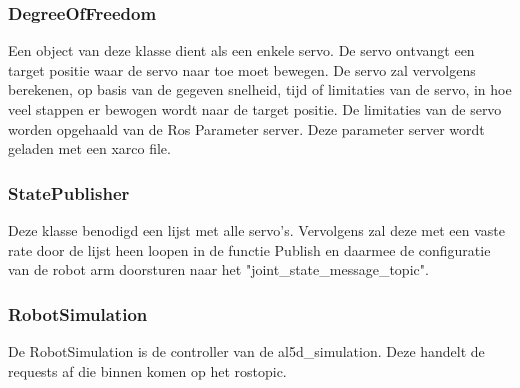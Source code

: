 \documentclass[11pt,titlepage]{article}
\begin{document}
\subsubsection{DegreeOfFreedom}
Een object van deze klasse dient als een enkele servo. De servo ontvangt een target positie waar de servo naar toe moet bewegen. De servo zal vervolgens berekenen, op basis van de gegeven snelheid, tijd of limitaties van de servo, in hoe veel stappen er bewogen wordt naar de target positie. De limitaties van de servo worden opgehaald van de Ros Parameter server. Deze parameter server wordt geladen met een xarco file.

\subsubsection{StatePublisher}
Deze klasse benodigd een lijst met alle servo's. Vervolgens zal deze met een vaste rate door de lijst heen loopen in de functie Publish en daarmee de configuratie van de robot arm doorsturen naar het "joint\_state\_message\_topic".

\subsubsection{RobotSimulation}
De RobotSimulation is de controller van de al5d\_simulation. Deze handelt de requests af die binnen komen op het rostopic.
\end{document}
